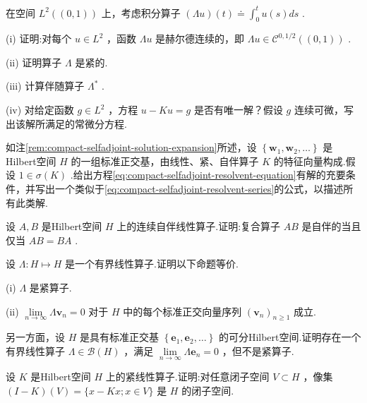 \begin{rbhw}
在空间 ${L}^{2}\left( \left(  {0,1}\right)  \right)$ 上，考虑积分算子 $\left( {\Lambda u}\right) \left( t\right)  \doteq  {\int }_{0}^{t}u\left( s\right) {ds}$ .

(i) 证明:对每个 $u \in  {L}^{2}$ ，函数 ${\Lambda u}$ 是赫尔德连续的，即 ${\Lambda u} \in  {\mathcal{C}}^{0,1/2}\left( \left(  {0,1}\right)  \right)$ .

(ii) 证明算子 $\Lambda$ 是紧的.

(iii) 计算伴随算子 ${\Lambda }^{ * }$ .

(iv) 对给定函数 $g \in  {L}^{2}$ ，方程 $u - {Ku} = g$ 是否有唯一解？假设 $g$ 连续可微，写出该解所满足的常微分方程.
\end{rbhw}

\begin{rbhw}
如注\ref{rem:compact-selfadjoint-solution-expansion}所述，设 $\left\{  {{\bm{w}}_{1},{\bm{w}}_{2},\ldots }\right\}$ 是Hilbert空间 $H$ 的一组标准正交基，由线性、紧、自伴算子 $K$ 的特征向量构成.假设 $1 \in  \sigma \left( K\right)$ .给出方程\eqref{eq:compact-selfadjoint-resolvent-equation}有解的充要条件，并写出一个类似于\eqref{eq:compact-selfadjoint-resolvent-series}的公式，以描述所有此类解.
\end{rbhw}

\begin{rbhw}
设 $A,B$ 是Hilbert空间 $H$ 上的连续自伴线性算子.证明:复合算子 ${AB}$ 是自伴的当且仅当 ${AB} = {BA}$ .
\end{rbhw}

\begin{rbhw}
设 $\Lambda  : H \mapsto  H$ 是一个有界线性算子.证明以下命题等价.

(i) $\Lambda$ 是紧算子.

(ii) $\mathop{\lim }\limits_{{n \rightarrow  \infty }}\Lambda {\bm{v}}_{n} = 0$ 对于 $H$ 中的每个标准正交向量序列 ${\left( {\bm{v}}_{n}\right) }_{n \geq  1}$ 成立.

另一方面，设 $H$ 是具有标准正交基 $\left\{  {{\bm{e}}_{1},{\bm{e}}_{2},\ldots }\right\}$ 的可分Hilbert空间.证明存在一个有界线性算子 $\Lambda  \in  \mathcal{B}\left( H\right)$ ，满足 $\mathop{\lim }\limits_{{n \rightarrow  \infty }}\Lambda {\bm{e}}_{n} = 0$ ，但不是紧算子.
\end{rbhw}

\begin{rbhw}
设 $K$ 是Hilbert空间 $H$ 上的紧线性算子.证明:对任意闭子空间 $V \subset  H$ ，像集 $\left( {I - K}\right) \left( V\right)  = \{ x - {Kx};x \in  V\}$ 是 $H$ 的闭子空间.
\end{rbhw}

